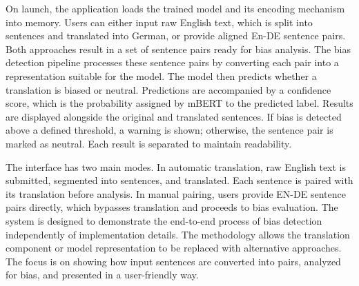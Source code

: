     On launch, the application loads the trained model and its encoding mechanism into memory. Users can either input raw English text, which is split into sentences and translated into German, or provide aligned En-DE sentence pairs. Both approaches result in a set of sentence pairs ready for bias analysis. The bias detection pipeline processes these sentence pairs by converting each pair into a representation suitable for the model. The model then predicts whether a translation is biased or neutral. Predictions are accompanied by a confidence score, which is the probability assigned by mBERT to the predicted label. Results are displayed alongside the original and translated sentences. If bias is detected above a defined threshold, a warning is shown; otherwise, the sentence pair is marked as neutral. Each result is separated to maintain readability.

    The interface has two main modes. In automatic translation, raw English text is submitted, segmented into sentences, and translated. Each sentence is paired with its translation before analysis. In manual pairing, users provide EN-DE sentence pairs directly, which bypasses translation and proceeds to bias evaluation. The system is designed to demonstrate the end-to-end process of bias detection independently of implementation details. The methodology allows the translation component or model representation to be replaced with alternative approaches. The focus is on showing how input sentences are converted into pairs, analyzed for bias, and presented in a user-friendly way. 
